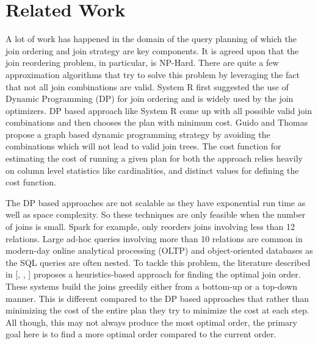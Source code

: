 \section{Related Work}
A lot of work has happened in the domain of the query planning of which the join ordering and join strategy are key components. It is agreed upon that the join reordering problem, in particular, is NP-Hard. There are quite a few approximation algorithms that try to solve this problem by leveraging the fact that not all join combinations are valid. System R \cite{b1} first suggested the use of Dynamic Programming (DP) for join ordering and is widely used by the join optimizers. DP based approach like System R come up with all possible valid join combinations and then chooses the plan with minimum cost. Guido and Thomas \cite{b3} propose a graph based dynamic programming strategy by avoiding the combinations which will not lead to valid join trees. The cost function for estimating the cost of running a given plan for both the approach relies heavily on column level statistics like cardinalities, and distinct values for defining the cost function.

The DP based approaches are not scalable as they have exponential run time as well as space complexity. So these techniques are only feasible when the number of joins is small. Spark for example, only reorders joins involving less than 12 relations. Large ad-hoc queries involving more than 10 relations are common in modern-day online analytical processing (OLTP) and object-oriented databases as the SQL queries are often nested. To tackle this problem,  the literature described in [\cite{b4}, \cite{b5}, \cite{b6}] proposes a heuristics-based approach for finding the optimal join order. These systems build the joins greedily either from a bottom-up or a top-down manner. This is different compared to the DP based approaches that rather than minimizing the cost of the entire plan they try to minimize the cost at each step. All though, this may not always produce the most optimal order, the primary goal here is to find a more optimal order compared to the current order.

